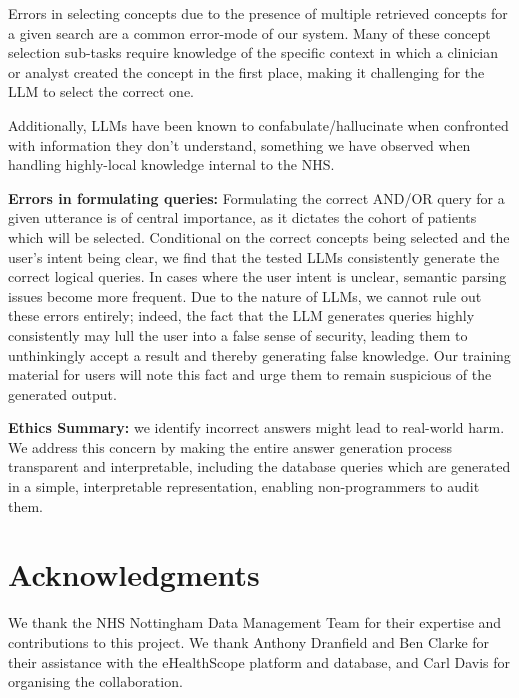 \documentclass[11pt]{article}
\begin{document}
Errors in selecting concepts due to the presence of multiple retrieved concepts for a given search are a common error-mode of our system. Many of these concept selection sub-tasks require knowledge of the specific context in which a clinician or analyst created the concept in the first place, making it challenging for the LLM to select the correct one.

Additionally, LLMs have been known to confabulate/hallucinate when confronted with information they don't understand, something we have observed when handling highly-local knowledge internal to the NHS.

\textbf{Errors in formulating queries:}
Formulating the correct AND/OR query for a given utterance is of central importance, as it dictates the cohort of patients which will be selected.
Conditional on the correct concepts being selected and the user's intent being clear, we find that the tested LLMs consistently generate the correct logical queries.
In cases where the user intent is unclear, semantic parsing issues become more frequent. Due to the nature of LLMs, we cannot rule out these errors entirely; indeed, the fact that the LLM generates queries highly consistently may lull the user into a false sense of security, leading them to unthinkingly accept a result and thereby generating false knowledge. Our training material for users will note this fact and urge them to remain suspicious of the generated output.

\textbf{Ethics Summary:} we identify incorrect answers might lead to real-world harm. We address this concern by making the entire answer generation process transparent and interpretable, including the database queries which are generated in a simple, interpretable representation, enabling non-programmers to audit them.


\section*{Acknowledgments}
We thank the NHS Nottingham Data Management Team for their expertise and contributions to this project. We thank Anthony Dranfield and Ben Clarke for their assistance with the eHealthScope platform and database, and Carl Davis for organising the collaboration.



\appendix

\end{document}
